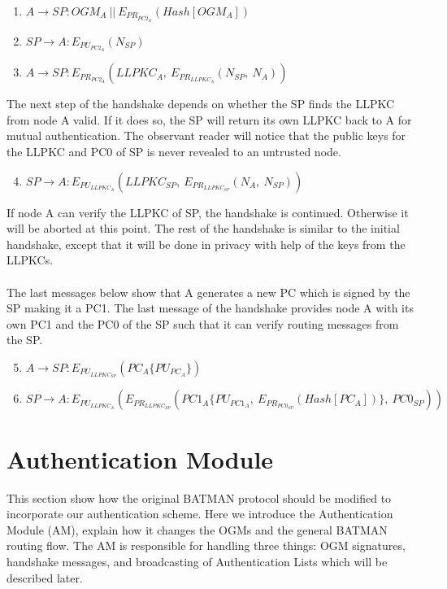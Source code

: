 \begin{enumerate}[I]
\item $A \rightarrow SP: OGM_{A} \: || \: E_{PR_{PC2_{A}}}(Hash[OGM_{A}])$
\item $SP \rightarrow A: E_{PU_{PC2_{A}}}(N_{SP})$
\item $A \rightarrow SP: E_{PR_{PC2_{A}}}(LLPKC_{A}, \: E_{PR_{LLPKC_{A}}}(N_{SP}, \: N_{A}))$
\end{enumerate}

\noindent
The next step of the handshake depends on whether the SP finds the LLPKC from node A valid. If it does so, the SP will return its own LLPKC back to A for mutual authentication. The observant reader will notice that the public keys for the LLPKC and PC0 of SP is never revealed to an untrusted node.

\begin{enumerate}[I]
\setcounter{enumi}{3}
\item $SP \rightarrow A: E_{PU_{LLPKC_{A}}}(LLPKC_{SP}, \: E_{PR_{LLPKC_{SP}}}(N_{A}, \: N_{SP}))$
\end{enumerate}

\noindent
If node A can verify the LLPKC of SP, the handshake is continued. Otherwise it will be aborted at this point. The rest of the handshake is similar to the initial handshake, except that it will be done in privacy with help of the keys from the LLPKCs.
\\\\
The last messages below show that A generates a new PC which is signed by the SP making it a PC1. The last message of the handshake provides node A with its own PC1 and the PC0 of the SP such that it can verify routing messages from the SP.

\begin{enumerate}[I]
\setcounter{enumi}{4}
\item $A \rightarrow SP: E_{PU_{LLPKC_{SP}}}(PC_{A}\{PU_{PC_{A}}\})$
\item $SP \rightarrow A: E_{PU_{LLPKC_{A}}}(E_{PR_{LLPKC_{SP}}}(PC1_{A}\{PU_{PC1_{A}}, \: E_{PR_{PC0_{SP}}}(Hash[PC_{A}])\}, \: PC0_{SP}))$
\end{enumerate}


\section{Authentication Module} \label{am}
This section show how the original BATMAN protocol should be modified to incorporate our authentication scheme. Here we introduce the Authentication Module (AM), explain how it changes the OGMs and the general BATMAN routing flow. The AM is responsible for handling three things: OGM signatures, handshake messages, and broadcasting of Authentication Lists which will be described later. 

